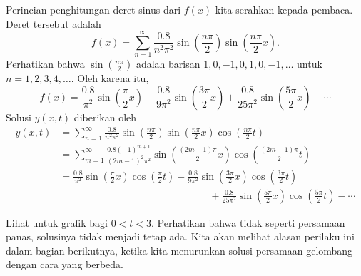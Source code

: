 \begin{example}
Perincian penghitungan deret sinus dari $f(x)$
kita serahkan kepada pembaca.  Deret tersebut adalah
\begin{equation*}
f(x) = \sum_{n=1}^\infty
\frac{0.8}{n^2 \pi^2}
\sin \left( \frac{n \pi}{2} \right)
\sin \left( \frac{n \pi}{2} x \right) .
\end{equation*}
Perhatikan bahwa 
$\sin \left( \frac{n \pi}{2} \right)$
adalah barisan $1, 0, -1, 0, 1, 0, -1, \ldots$
untuk $n = 1,2,3,4,\ldots$.  Oleh karena itu,
\begin{equation*}
f(x) = 
\frac{0.8}{\pi^2}
\sin \left( \frac{\pi}{2} x \right)
-
\frac{0.8}{9 \pi^2}
\sin \left( \frac{3 \pi}{2} x \right)
+
\frac{0.8}{25 \pi^2}
\sin \left( \frac{5 \pi}{2} x \right)
- \cdots
\end{equation*}
Solusi $y(x,t)$ diberikan oleh
\begin{equation*}
\begin{split}
y(x,t) & = 
\sum_{n=1}^\infty
\frac{0.8}{n^2 \pi^2}
\sin \left( \frac{n \pi}{2} \right)
\sin \left( \frac{n \pi}{2} x \right)
\cos \left( \frac{n \pi}{2} t \right)
\\
& = 
\sum_{m=1}^\infty
\frac{0.8 {(-1)}^{m+1}}{{(2m-1)}^2 \pi^2}
\sin \left( \frac{(2m-1) \pi}{2} x \right)
\cos \left( \frac{(2m-1) \pi}{2} t \right)
\\
& =
\frac{0.8}{\pi^2} 
\sin \left( \frac{\pi}{2}  x \right)
\cos \left( \frac{\pi}{2}  t \right)
-
\frac{0.8}{9 \pi^2} 
\sin \left( \frac{3 \pi}{2}  x \right)
\cos \left( \frac{3 \pi}{2}  t \right)
\\
& \hspace{15em}
+
\frac{0.8}{25 \pi^2}
\sin \left( \frac{5 \pi}{2}  x \right)
\cos \left( \frac{5 \pi}{2}  t \right) 
- \cdots
\end{split}
\end{equation*}

Lihat 
 untuk grafik
bagi $0 < t < 3$.  Perhatikan
bahwa tidak seperti persamaan panas, solusinya tidak menjadi
 tetap ada.  Kita akan melihat alasan perilaku ini dalam
bagian berikutnya, ketika kita menurunkan solusi persamaan gelombang dengan cara
yang berbeda.

\begin{myfig}
\capstart
{}
\caption{Bentuk senar yang dipetik untuk $0 < t < 3$.\label{wave:pluckedexfig}}
\end{myfig}


\end{example}
